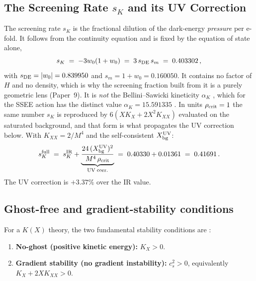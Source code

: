 \documentclass[12pt,a4paper]{article}
\newcommand{\sK}{s_K}
\newcommand{\rhoc}{\rho_{\rm crit}}
\begin{document}
\subsection{The Screening Rate $\sK$ and its UV Correction}

The screening rate $\sK$ is the fractional dilution of the dark-energy
\emph{pressure} per e-fold. It follows from the continuity equation and is
fixed by the equation of state alone,
\begin{equation}
  \sK \;=\; -3w_0(1+w_0) \;=\; 3\,s_{\rm DE}\,s_m \;=\; 0.403302\,,
  \label{eq:sKdef}
\end{equation}
with $s_{\rm DE} = |w_0| = 0.839950$ and $s_m = 1+w_0 = 0.160050$. It contains
no factor of $H$ and no density, which is why the screening fraction built from
it is a purely geometric lens (Paper~9). It is \emph{not} the Bellini--Sawicki
kineticity $\alpha_K$ \citep{BelliniSawicki2014,Cheung2008,Gubitosi2013}, which
for the SSEE action has the distinct value $\alpha_K = 15.591335$
\citep{SSEE7}. In units $\rhoc = 1$ the same number $\sK$ is reproduced by
$6\left(X K_X + 2X^2 K_{XX}\right)$ evaluated on the saturated background, and
that form is what propagates the UV correction below.
With $K_{XX} = 2/M^4$ and the self-consistent $X_{\rm bg}^{\rm UV}$:
\begin{equation}
  \sK^{\rm full}
  \;=\; \sK^{\rm IR}
        + \underbrace{\frac{24\,(X_{\rm bg}^{\rm UV})^2}{M^4\,\rhoc}}_{\rm UV\;corr.}
  \;=\; 0.40330 + 0.01361
  \;=\; 0.41691\,.
  \label{eq:sKfullform}
\end{equation}
The UV correction is $+3.37\%$ over the IR value.

\subsection{Ghost-free and gradient-stability conditions}
\label{subsec:stability_UV}

For a $K(X)$ theory, the two fundamental stability conditions are
\citep{Garriga1999}:
\begin{enumerate}
  \item \textbf{No-ghost (positive kinetic energy):} $K_X > 0$.
  \item \textbf{Gradient stability (no gradient instability):} $c_s^2 > 0$,
    equivalently $K_X + 2XK_{XX} > 0$.
\end{enumerate}
\end{document}
